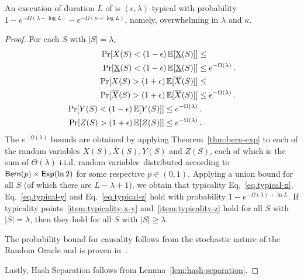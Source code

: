 
\begin{theorem}[Typicality]\label{thm:typicality}
  An execution of duration $L$ of \poem is $(\epsilon, \lambda)$-typical with
  probability $1 - e^{-\Omega(\lambda - \log L)} - e^{-\Omega(\kappa - \log L)}$,
  namely, overwhelming in $\lambda$ and $\kappa$.
\end{theorem}
\begin{proof}
  For each $S$ with $|S| = \lambda$,
  \begin{align*}
    \Pr[X(S) < (1 - \epsilon)\mathop{{}\mathbb{E}}[\underbar{X}(S)]] &\leq\\
    \Pr[\underbar{X}(S) < (1 - \epsilon)\mathop{{}\mathbb{E}}[\underbar{X}(S)]] &\leq
    e^{-\Omega(\lambda)} \,.\\
    \Pr[X(S) > (1 + \epsilon)\mathop{{}\mathbb{E}}[\overline{X}(S)]] &\leq\\
    \Pr[\overline{X}(S) > (1 + \epsilon)\mathop{{}\mathbb{E}}[\overline{X}(S)]] &\leq
    e^{-\Omega(\lambda)} \,.\\
    \Pr[Y(S) < (1 - \epsilon)\mathop{{}\mathbb{E}}[Y(S)]] \leq e^{-\Omega(\lambda)} &\,.\\
    \Pr[Z(S) > (1 + \epsilon)\mathop{{}\mathbb{E}}[Z(S)]] \leq e^{-\Omega(\lambda)} &\,.\\
  \end{align*}
  The $e^{-\Omega(\lambda)}$ bounds are obtained by applying
  Theorem~\ref{thm:bern-exp} to each of the random variables
  $\underbar{X}(S), \overline{X}(S), Y(S)$ and $Z(S)$, each
  of which is the sum of $\Theta(\lambda)$ i.i.d. random variables\
  distributed according to $\textsf{Bern}(p) \times \textsf{Exp}(\ln2)$ for
  some respective $p \in (0, 1)$.
  Applying a union bound for all $S$ (of which there are $L - \lambda + 1$),
  we obtain that typicality Eq.~\ref{eq.typical-x}, Eq.~\ref{eq.typical-y}
  and Eq.~\ref{eq.typical-z}
  hold with probability $1 - e^{-\Omega(\lambda)+\ln L}$.
  If typicality points~\ref{item:typicality-x-y} and~\ref{item:typicality-z}
  hold for all $S$ with $|S| = \lambda$, then they hold for all $S$ with
  $|S| \geq \lambda$.

  The probability bound for causality follows from the stochastic nature
  of the Random Oracle and is proven in~\cite{backbone}.

  Lastly, Hash Separation follows from Lemma~\ref{lem:hash-separation}.
  \Qed
\end{proof}

